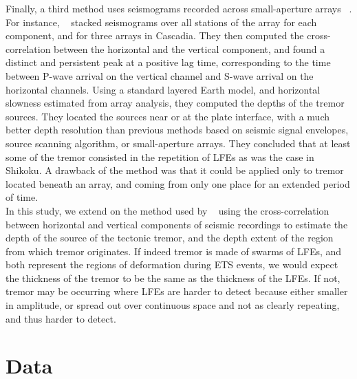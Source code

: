 \documentclass[draft]{agujournal2019}
\begin{document}
Finally, a third method uses seismograms recorded across small-aperture arrays ~\cite{GHO_2010_GRL, LAR_2009}. For instance, ~ stacked seismograms over all stations of the array for each component, and for three arrays in Cascadia. They then computed the cross-correlation between the horizontal and the vertical component, and found a distinct and persistent peak at a positive lag time, corresponding to the time between P-wave arrival on the vertical channel and S-wave arrival on the horizontal channels. Using a standard layered Earth model, and horizontal slowness estimated from array analysis, they computed the depths of the tremor sources. They located the sources near or at the plate interface, with a much better depth resolution than previous methods based on seismic signal envelopes, source scanning algorithm, or small-aperture arrays. They concluded that at least some of the tremor consisted in the repetition of LFEs as was the case in Shikoku. A drawback of the method was that it could be applied only to tremor located beneath an array, and coming from only one place for an extended period of time. \\

In this study, we extend on the method used by ~ using the cross-correlation between horizontal and vertical components of seismic recordings to estimate the depth of the source of the tectonic tremor, and the depth extent of the region from which tremor originates. If indeed tremor is made of swarms of LFEs, and both represent the regions of deformation during ETS events, we would expect the thickness of the tremor to be the same as the thickness of the LFEs. If not, tremor may be occurring where LFEs are harder to detect because either smaller in amplitude, or spread out over continuous space and not as clearly repeating, and thus harder to detect.

\section{Data}
\end{document}
